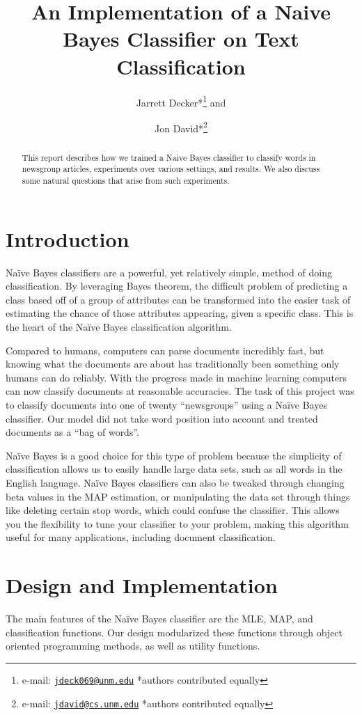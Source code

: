 \documentclass{IEEEtran}
\author{Jarrett Decker*\thanks{e-mail:
    \href{mailto:jdeck069@unm.edu}
         {\texttt{jdeck069@unm.edu}}
         {*authors contributed equally}} and
\and
       Jon David*\thanks{e-mail:
    \href{mailto:jdavid@cs.unm.edu}
         {\texttt{jdavid@cs.unm.edu}}
         {*authors contributed equally}}}
\title{An Implementation of a Naive Bayes Classifier on Text Classification}
\begin{document}
\maketitle

\begin{abstract}
This report describes how we trained a Naive Bayes classifier to classify words in newsgroup articles, experiments over various settings, and results. We also discuss some natural questions that arise from such experiments.
\end{abstract}


\section{Introduction}
Naïve Bayes classifiers are a powerful, yet relatively simple, method of doing classification. By leveraging Bayes theorem, the difficult problem of predicting a class based off of a group of attributes can be transformed into the easier task of estimating the chance of those attributes appearing, given a specific class. This is the heart of the Naïve Bayes classification algorithm.

Compared to humans, computers can parse documents incredibly fast, but knowing what the documents are about has traditionally been something only humans can do reliably. With the progress made in machine learning computers can now classify documents at reasonable accuracies. The task of this project was to classify documents into one of twenty “newsgroups” using a Naïve Bayes classifier. Our model did not take word position into account and treated documents as a “bag of words”. 

Naïve Bayes is a good choice for this type of problem because the simplicity of classification allows us to easily handle large data sets, such as all words in the English language.  Naïve Bayes classifiers can also be tweaked through changing beta values in the MAP estimation, or manipulating the data set through things like deleting certain stop words, which could confuse the classifier. This allows you the flexibility to tune your classifier to your problem, making this algorithm useful for many applications, including document classification.

\section{Design and Implementation}
The main features of the Naïve Bayes classifier are the MLE, MAP, and classification functions. Our design modularized these functions through object oriented programming methods, as well as utility functions. 
\end{document}
